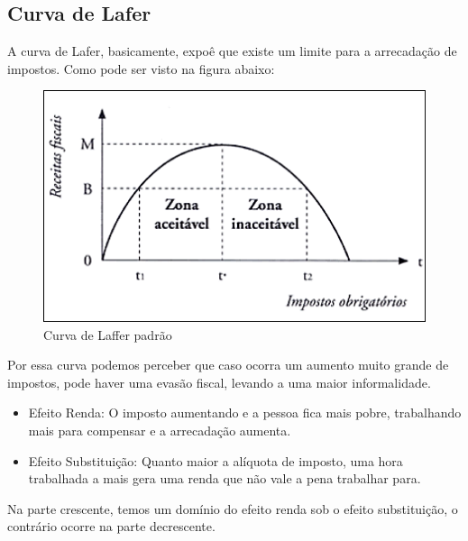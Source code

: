 \subsection*{Curva de Lafer}
A curva de Lafer, basicamente, expoê que existe um limite para a arrecadação de impostos. Como pode ser visto na figura abaixo: 
\begin{figure}[h!]
    \centering
    \includegraphics{Elementos do Texto/Figuras/84c4cf1024e60fe5773b5d4ef2615d8b.png}
    \caption{Curva de Laffer padrão}
    \label{Lafer}
\end{figure}
Por essa curva podemos perceber que caso ocorra um aumento muito grande de impostos, pode haver uma evasão fiscal, levando a uma maior informalidade.
\begin{itemize}
    \item Efeito Renda: O imposto aumentando e a pessoa fica mais pobre, trabalhando mais para compensar e a arrecadação aumenta. 
    \item Efeito Substituição: Quanto maior a alíquota de imposto, uma hora trabalhada a mais gera uma renda que não vale a pena trabalhar para. 
\end{itemize}
Na parte crescente, temos um domínio do efeito renda sob o efeito substituição, o contrário ocorre na parte decrescente. 
